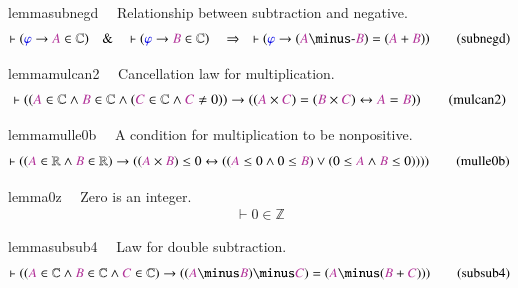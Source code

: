\begin{restatable}{lemma}{subnegd}~~ Relationship between subtraction and
negative.  ~
\begin{align}
\vdash ( \mw{\varphi} \rightarrow \mc{A} \in \mathbb{C} )\quad\&\quad \vdash (
    \mw{\varphi} \rightarrow \mc{B} \in \mathbb{C} )\quad\Rightarrow\quad
    \vdash ( \mw{\varphi} \rightarrow ( \mc{A} \minus \textrm{-} \mc{B} ) = (
    \mc{A} + \mc{B} ) )\label{eq:subnegd}\tag{subnegd}
\end{align}
\end{restatable}

\begin{restatable}{lemma}{mulcan2}~~ Cancellation law for multiplication. 
~
     ~
\begin{align}
\vdash ( ( \mc{A} \in \mathbb{C} \wedge \mc{B} \in \mathbb{C} \wedge ( \mc{C}
    \in \mathbb{C} \wedge \mc{C} \ne 0 ) ) \rightarrow ( ( \mc{A} \times \mc{C}
    ) = ( \mc{B} \times \mc{C} ) \leftrightarrow \mc{A} = \mc{B} )
    )\label{eq:mulcan2}\tag{mulcan2}
\end{align}
\end{restatable}

\begin{restatable}{lemma}{mulle0b}~~ A condition for multiplication to be
nonpositive.  ~
\begin{align}
\vdash ( ( \mc{A} \in \mathbb{R} \wedge \mc{B} \in \mathbb{R} ) \rightarrow ( (
    \mc{A} \times \mc{B} ) \le 0 \leftrightarrow ( ( \mc{A} \le 0 \wedge 0 \le
    \mc{B} ) \vee ( 0 \le \mc{A} \wedge \mc{B} \le 0 ) ) )
    )\label{eq:mulle0b}\tag{mulle0b}
\end{align}
\end{restatable}

\begin{restatable}{lemma}{0z}~~ Zero is an integer.  ~
\begin{align}
\vdash 0 \in \mathbb{Z}\label{eq:0z}\tag{0z}
\end{align}
\end{restatable}

\begin{restatable}{lemma}{subsub4}~~ Law for double subtraction.  
\begin{align}
\vdash ( ( \mc{A} \in \mathbb{C} \wedge \mc{B} \in \mathbb{C} \wedge \mc{C} \in
    \mathbb{C} ) \rightarrow ( ( \mc{A} \minus \mc{B} ) \minus \mc{C} ) = (
    \mc{A} \minus ( \mc{B} + \mc{C} ) ) )\label{eq:subsub4}\tag{subsub4}
\end{align}
\end{restatable}

